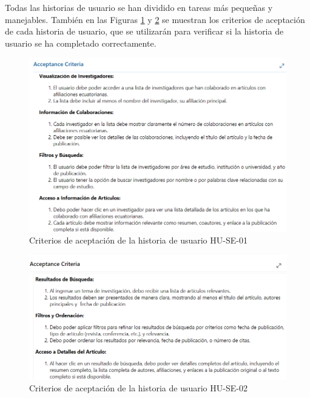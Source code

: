 Todas las historias de usuario se han dividido en tareas más pequeñas y manejables. 
También en las Figuras \ref{fig:aceptance-criteria-HU-SE-01}  y  \ref{fig:aceptance-criteria-HU-SE-02} se muestran los criterios de aceptación de cada historia de usuario, que se utilizarán para verificar si la historia de usuario se ha completado correctamente.
\begin{figure}[H]
    \centering
    \includegraphics[scale=0.7]{../02Figures/02Chapter/Sprints/Sprint-1/aceptance-criteria-HU-SE-01.png}
    \caption{Criterios de aceptación de la historia de usuario HU-SE-01}
    \label{fig:aceptance-criteria-HU-SE-01}
\end{figure}
\begin{figure}[H]
    \centering
    \includegraphics[scale=0.7]{../02Figures/02Chapter/Sprints/Sprint-1/aceptance-criteria-HU-SE-02.png}
    \caption{Criterios de aceptación de la historia de usuario HU-SE-02}
    \label{fig:aceptance-criteria-HU-SE-02}
\end{figure}


